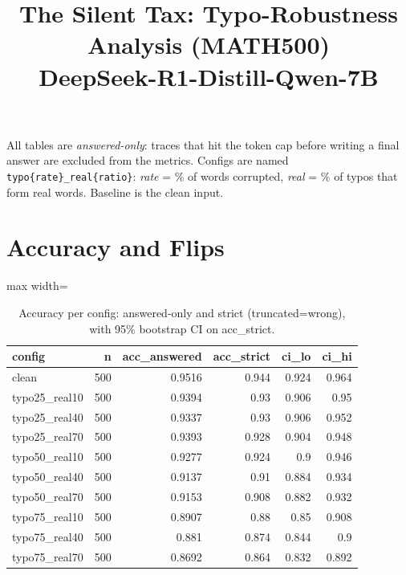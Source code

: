 \documentclass[11pt]{article}
\title{The Silent Tax: Typo-Robustness Analysis (MATH500)\\\large DeepSeek-R1-Distill-Qwen-7B}
\date{}
\begin{document}
\maketitle
\noindent All tables are \emph{answered-only}: traces that hit the token cap before writing a final answer are excluded from the metrics. Configs are named \texttt{typo\{rate\}\_real\{ratio\}}: \emph{rate} = \% of words corrupted, \emph{real} = \% of typos that form real words. Baseline is the clean input.

\section*{Accuracy and Flips}
\begin{table}[H]
\centering
\caption{Accuracy per config: answered-only and strict (truncated=wrong), with 95\% bootstrap CI on acc\_strict.}
\small
\begin{adjustbox}{max width=\textwidth}
\begin{tabular}{lrrrrr}
\toprule
\textbf{config} & \textbf{n} & \textbf{acc\_answered} & \textbf{acc\_strict} & \textbf{ci\_lo} & \textbf{ci\_hi} \\
\midrule
clean & 500 & 0.9516 & 0.944 & 0.924 & 0.964 \\
typo25\_real10 & 500 & 0.9394 & 0.93 & 0.906 & 0.95 \\
typo25\_real40 & 500 & 0.9337 & 0.93 & 0.906 & 0.952 \\
typo25\_real70 & 500 & 0.9393 & 0.928 & 0.904 & 0.948 \\
typo50\_real10 & 500 & 0.9277 & 0.924 & 0.9 & 0.946 \\
typo50\_real40 & 500 & 0.9137 & 0.91 & 0.884 & 0.934 \\
typo50\_real70 & 500 & 0.9153 & 0.908 & 0.882 & 0.932 \\
typo75\_real10 & 500 & 0.8907 & 0.88 & 0.85 & 0.908 \\
typo75\_real40 & 500 & 0.881 & 0.874 & 0.844 & 0.9 \\
typo75\_real70 & 500 & 0.8692 & 0.864 & 0.832 & 0.892 \\
\bottomrule
\end{tabular}
\end{adjustbox}
\end{table}
\end{document}
